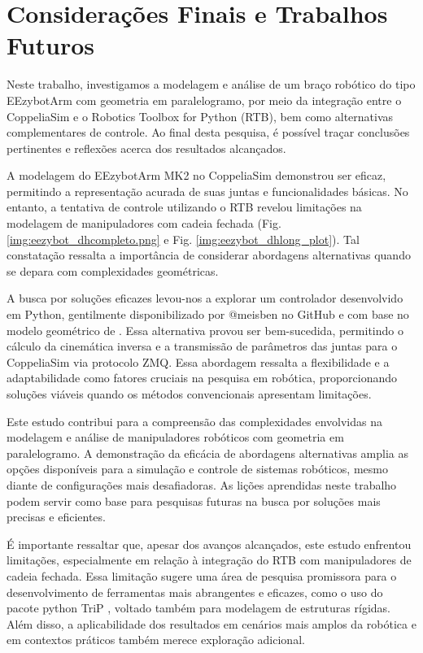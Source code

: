 \chapter{Considerações Finais e Trabalhos Futuros}

Neste trabalho, investigamos a modelagem e análise de um braço robótico do tipo EEzybotArm com geometria em paralelogramo, por meio da integração entre o CoppeliaSim e o Robotics Toolbox for Python (RTB), bem como alternativas complementares de controle. Ao final desta pesquisa, é possível traçar conclusões pertinentes e reflexões acerca dos resultados alcançados.

A modelagem do EEzybotArm MK2 no CoppeliaSim demonstrou ser eficaz, permitindo a representação acurada de suas juntas e funcionalidades básicas. No entanto, a tentativa de controle utilizando o RTB revelou limitações na modelagem de manipuladores com cadeia fechada (Fig. \ref{img:eezybot_dhcompleto.png} e Fig. \ref{img:eezybot_dhlong_plot}). Tal constatação ressalta a importância de considerar abordagens alternativas quando se depara com complexidades geométricas.

A busca por soluções eficazes levou-nos a explorar um controlador desenvolvido em Python, gentilmente disponibilizado por @meisben no GitHub e com base no modelo geométrico de . Essa alternativa provou ser bem-sucedida, permitindo o cálculo da cinemática inversa e a transmissão de parâmetros das juntas para o CoppeliaSim via protocolo ZMQ. Essa abordagem ressalta a flexibilidade e a adaptabilidade como fatores cruciais na pesquisa em robótica, proporcionando soluções viáveis quando os métodos convencionais apresentam limitações.

Este estudo contribui para a compreensão das complexidades envolvidas na modelagem e análise de manipuladores robóticos com geometria em paralelogramo. A demonstração da eficácia de abordagens alternativas amplia as opções disponíveis para a simulação e controle de sistemas robóticos, mesmo diante de configurações mais desafiadoras. As lições aprendidas neste trabalho podem servir como base para pesquisas futuras na busca por soluções mais precisas e eficientes.

É importante ressaltar que, apesar dos avanços alcançados, este estudo enfrentou limitações, especialmente em relação à integração do RTB com manipuladores de cadeia fechada. Essa limitação sugere uma área de pesquisa promissora para o desenvolvimento de ferramentas mais abrangentes e eficazes, como o uso do pacote python TriP \cite{baumgartner2022trip}, voltado também para modelagem de estruturas rígidas. Além disso, a aplicabilidade dos resultados em cenários mais amplos da robótica e em contextos práticos também merece exploração adicional.

